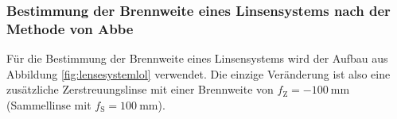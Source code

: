 \subsubsection{Bestimmung der Brennweite eines Linsensystems nach der Methode von Abbe}
\label{sec:abbe}
Für die Bestimmung der Brennweite eines Linsensystems wird der Aufbau aus Abbildung 
\ref{fig:lensesystemlol} verwendet.
Die einzige Veränderung ist also eine zusätzliche Zerstreuungslinse mit einer Brennweite von 
$f_{\mathrm{Z}} = -\SI{100}{\milli\meter}$ (Sammellinse mit $f_{\mathrm{S}}=\SI{100}{\milli\meter}$).





